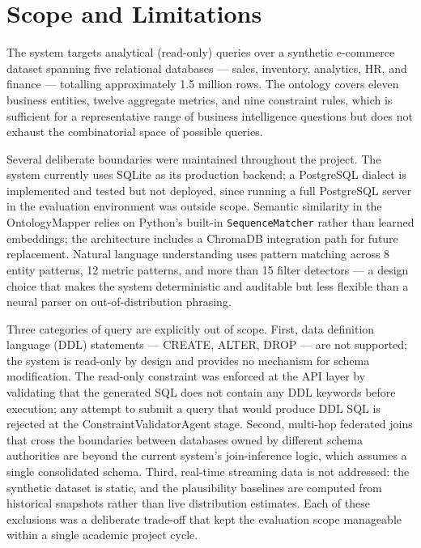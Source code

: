\documentclass[12pt,a4paper]{report}
\begin{document}
\section{Scope and Limitations}
\label{sec:scope}

The system targets analytical (read-only) queries over a synthetic e-commerce dataset spanning five relational databases — sales, inventory, analytics, HR, and finance — totalling approximately 1.5 million rows. The ontology covers eleven business entities, twelve aggregate metrics, and nine constraint rules, which is sufficient for a representative range of business intelligence questions but does not exhaust the combinatorial space of possible queries.

Several deliberate boundaries were maintained throughout the project. The system currently uses \ac{SQL}ite as its production backend; a PostgreSQL dialect is implemented and tested but not deployed, since running a full PostgreSQL server in the evaluation environment was outside scope. Semantic similarity in the OntologyMapper relies on Python's built-in \texttt{SequenceMatcher} rather than learned embeddings; the architecture includes a ChromaDB integration path for future replacement. Natural language understanding uses pattern matching across 8 entity patterns, 12 metric patterns, and more than 15 filter detectors — a design choice that makes the system deterministic and auditable but less flexible than a neural parser on out-of-distribution phrasing.

Three categories of query are explicitly out of scope. First, data definition language (DDL) statements — CREATE, ALTER, DROP — are not supported; the system is read-only by design and provides no mechanism for schema modification. The read-only constraint was enforced at the \ac{API} layer by validating that the generated SQL does not contain any DDL keywords before execution; any attempt to submit a query that would produce DDL SQL is rejected at the ConstraintValidatorAgent stage. Second, multi-hop federated joins that cross the boundaries between databases owned by different schema authorities are beyond the current system's join-inference logic, which assumes a single consolidated schema. Third, real-time streaming data is not addressed: the synthetic dataset is static, and the plausibility baselines are computed from historical snapshots rather than live distribution estimates. Each of these exclusions was a deliberate trade-off that kept the evaluation scope manageable within a single academic project cycle.
\end{document}
